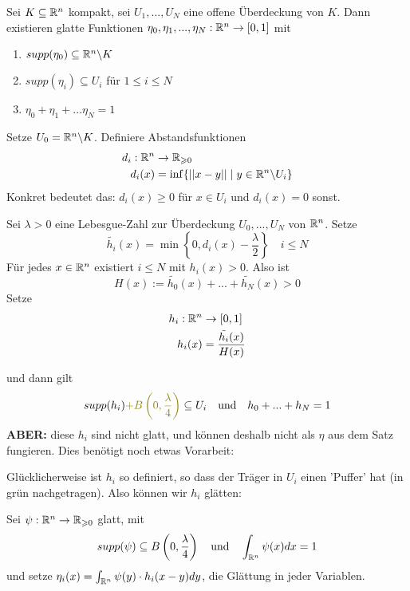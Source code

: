 \documentclass[main.tex]{subfiles}
\begin{document}
\begin{Theorem}
  Sei $K \subseteq \mathbb{R}^n$ kompakt, sei $U_1, ..., U_N$ eine offene Überdeckung von $K$. Dann existieren glatte Funktionen $\eta_0,\eta_1 , ..., \eta_N: \mathbb{R}^n \to [0,1]$ mit
  \begin{enumerate}
    \item $supp(\eta_0) \subseteq \mathbb{R}^n \backslash K$
    \item $supp(\eta_i) \subseteq U_i$ für $1 \leq i \leq N$
    \item $\eta_0 + \eta_1 + ... \eta_N = 1$
  \end{enumerate}
\end{Theorem}
\begin{Beweis}
  Setze $U_0 = \mathbb{R}^n \backslash K$. Definiere Abstandsfunktionen
  $$\begin{aligned}
    d_i : \mathbb{R}^n & \to \mathbb{R}_{\geqslant 0} \\
    d_i(x) & = \inf\{||x-y||\mid y \in \mathbb{R}^n \backslash U_i\}
  \end{aligned}$$
  Konkret bedeutet das: $d_i (x) \geq 0$ für $x \in U_i$ und $d_i(x) = 0$ sonst.

  Sei $\lambda > 0$ eine Lebesgue-Zahl zur Überdeckung $U_0,...,U_N$ von $\mathbb{R}^n$. Setze
  $$\tilde{h_i}(x) = \min\left\{0,d_i(x) - \frac{\lambda}{2}\right\} \quad i \leq N$$
  Für jedes $x \in \mathbb{R}^n$ existiert $i \leq N$ mit $h_i(x) > 0$. Also ist
  $$H(x) := \tilde{h_0}(x) + ... + \tilde{h_N}(x)> 0$$
  Setze
  $$\begin{aligned}
    h_i : \mathbb{R}^n & \to [0,1] \\
    h_i(x) & = \dfrac{\tilde{h_i}(x)}{H(x)}
  \end{aligned}$$

  und dann gilt
  $$supp(h_i) {\color{olive}  + B\left(0,\frac{\lambda}{4}\right)}\subseteq U_i \quad \text{und} \quad  h_0 + ... + h_N = 1$$
  \textbf{ABER:} diese $h_i$ sind nicht glatt, und können deshalb nicht als $\eta$ aus dem Satz fungieren. Dies benötigt noch etwas Vorarbeit:

  Glücklicherweise ist $h_i$ so definiert, so dass der Träger in $U_i$ einen 'Puffer' hat (in grün nachgetragen). Also können wir $h_i$ glätten:

  Sei $\psi : \mathbb{R}^n \to \mathbb{R}_{\geqslant 0}$ glatt, mit
  $$supp(\psi) \subseteq B\left(0,\frac{\lambda}{4}\right) \quad \text{und} \quad \int_{\mathbb{R}^n} \psi(x) dx = 1$$
  und setze $\eta_i(x) = \int_{\mathbb{R}^n} \psi(y) \cdot h_i(x-y) dy$, die Glättung in jeder Variablen.


\end{Beweis}
\end{document}
